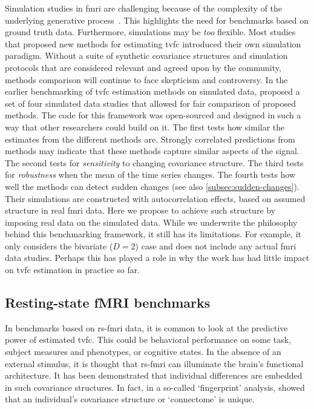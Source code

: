 Simulation studies in \gls{fmri} are challenging because of the complexity of the underlying generative process~\parencite{Welvaert2014}.
This highlights the need for benchmarks based on ground truth data.
%
Furthermore, simulations may be \emph{too} flexible.
Most studies that proposed new methods for estimating \gls{tvfc} introduced their own simulation paradigm.
Without a suite of synthetic covariance structures and simulation protocols that are considered relevant and agreed upon by the community, methods comparison will continue to face skepticism and controversy.
%
In the earlier benchmarking of \gls{tvfc} estimation methods on simulated data, \textcite{Thompson2018} proposed a set of four simulated data studies that allowed for fair comparison of proposed methods.
The code for this framework was open-sourced and designed in such a way that other researchers could build on it.
The first tests how similar the estimates from the different methods are.
Strongly correlated predictions from methods may indicate that these methods capture similar aspects of the signal.
The second tests for \emph{sensitivity} to changing covariance structure.
The third tests for \emph{robustness} when the mean of the time series changes.
The fourth tests how well the methods can detect sudden changes (see also \cref{subsec:sudden-changes}).
Their simulations are constructed with autocorrelation effects, based on assumed structure in real \gls{fmri} data.
Here we propose to achieve such structure by imposing real data on the simulated data.
While we underwrite the philosophy behind this benchmarking framework, it still has its limitations.
For example, it only considers the bivariate ($D = 2$) case and does not include any actual \gls{fmri} data studies.
Perhaps this has played a role in why the work has had little impact on \gls{tvfc} estimation in practice so far.

\subsection{Resting-state fMRI benchmarks}

In benchmarks based on \gls{rs-fmri} data, it is common to look at the predictive power of estimated \gls{tvfc}.
This could be behavioral performance on some task, subject measures and phenotypes, or cognitive states.
In the absence of an external stimulus, it is thought that \gls{rs-fmri} can illuminate the brain's functional architecture.
It has been demonstrated that individual differences are embedded in such covariance structures.
In fact, in a so-called `fingerprint' analysis, \textcite{Finn2015} showed that an individual's covariance structure or `connectome' is unique.

